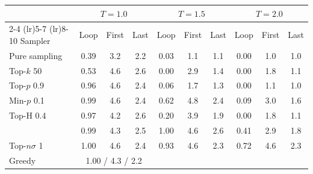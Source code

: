 \begin{tabular}{lccccccccc}
\toprule
 & \multicolumn{3}{c}{$T{=}1.0$} & \multicolumn{3}{c}{$T{=}1.5$} & \multicolumn{3}{c}{$T{=}2.0$} \\
\cmidrule(lr){2-4} \cmidrule(lr){5-7} \cmidrule(lr){8-10}
Sampler & Loop & First & Last & Loop & First & Last & Loop & First & Last \\
\midrule
Pure sampling & 0.39 & 3.2 & 2.2 & 0.03 & 1.1 & 1.1 & 0.00 & 1.0 & 1.0 \\
Top-$k$ 50 & 0.53 & 4.6 & 2.6 & 0.00 & 2.9 & 1.4 & 0.00 & 1.8 & 1.1 \\
Top-$p$ 0.9 & 0.96 & 4.6 & 2.4 & 0.06 & 1.7 & 1.3 & 0.00 & 1.1 & 1.0 \\
Min-$p$ 0.1 & 0.99 & 4.6 & 2.4 & 0.62 & 4.8 & 2.4 & 0.09 & 3.0 & 1.6 \\
Top-H 0.4 & 0.97 & 4.2 & 2.6 & 0.20 & 3.9 & 1.9 & 0.00 & 1.8 & 1.1 \\
\pless{} & 0.99 & 4.3 & 2.5 & 1.00 & 4.6 & 2.6 & 0.41 & 2.9 & 1.8 \\
Top-$n\sigma$ 1 & 1.00 & 4.6 & 2.4 & 0.93 & 4.6 & 2.3 & 0.72 & 4.6 & 2.3 \\
\midrule
Greedy & \multicolumn{3}{c}{1.00 / 4.3 / 2.2} &  &  &  &  &  &  \\
\bottomrule
\end{tabular}

